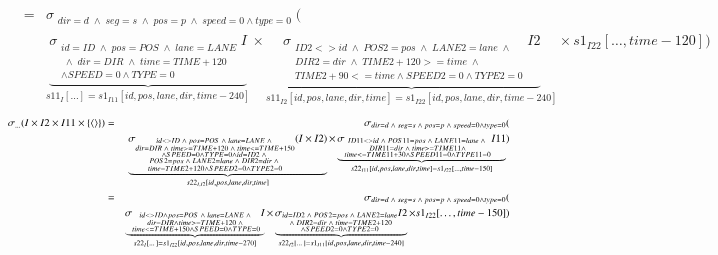 \begin{eqnarray}
&=& 
\sigma_{\substack{dir = d \;\wedge\; seg = s \;\wedge\; pos = p \;\wedge\; speed = 0 \wedge type = 0  }}(\\
\nonumber{}&& \underbrace{\sigma_{\substack{id = ID \;\wedge\; pos = POS \;\wedge\;  lane = LANE \\\;\wedge\; dir=DIR \;\wedge\; time = TIME + 120 \\\wedge SPEED = 0 \wedge TYPE = 0}} I}_{s11_{I}[\dots ]=s1_{I11}[id, pos, lane, dir, time-240]} \times 
\underbrace{\sigma_{\substack{ID2 <> id \;\wedge\; POS2 = pos \;\wedge\; LANE2 = lane \;\wedge\;\\ DIR2 = dir \;\wedge\; TIME2 +120 >= time \;\wedge\; \\TIME2 + 90 <= time \wedge SPEED2 = 0 \wedge TYPE2 = 0 }} I2}_{s11_{I2}[id, pos, lane, dir, time]=s1_{I22}[id, pos, lane, dir, time-240]} \times  
s1_{I22}[\dots, time-120]) 
\end{eqnarray}
\begin{eqnarray}
\sigma_{ \dots}(I \times I2 \times I11 \times \{\tuple{} \} )&=&
\sigma_{ \substack{dir = d \;\wedge\; seg = s \;\wedge\; pos = p \;\wedge\;speed = 0 \wedge type =0 }}(\\
\nonumber{}&&\underbrace{\sigma_{\substack{  id <> ID \;\wedge\;pos = POS \;\wedge\;  lane = LANE \;\wedge\;\\ dir = DIR   \;\wedge\; time >= TIME + 120 \;\wedge\; time <= TIME + 150 \\\wedge SPEED = 0 \wedge TYPE = 0 \wedge id = ID2 \;\wedge\;\\ POS2 = pos \;\wedge\; LANE2 = lane \;\wedge\; DIR2 = dir \;\wedge\; \\time = TIME2 + 120 \wedge  SPEED2 = 0 \wedge TYPE2 = 0}} (I \times I2)}_{s22_{I,I2}[id, pos, lane, dir, time]} \times 
\underbrace{\sigma_{\substack{ID11 <> id \;\wedge\; POS11 = pos \;\wedge\;  LANE11 = lane \;\wedge\;\\ DIR11=dir \;\wedge\; time >= TIME 11 \wedge\\ time <= TIME11 + 30  \wedge SPEED11 = 0 \wedge TYPE11 = 0}} I11}_{s22_{I11}[id, pos, lane, dir, time]=s1_{I22}[\dots, time-150]})\\
&=&
\sigma_{ \substack{dir = d \;\wedge\; seg = s \;\wedge\; pos = p \;\wedge\;speed = 0 \wedge type =0  }}(\\
\nonumber{}&&\underbrace{\sigma_{\substack{  id <> ID \wedge pos = POS \;\wedge\;  lane = LANE \;\wedge\;\\ dir = DIR \wedge  time >= TIME + 120 \;\wedge\;\\ time <= TIME + 150 \wedge SPEED = 0 \wedge TYPE = 0 }} I }_{s22_{I}[\dots]=s1_{I22}[id, pos, lane, dir, time-270]}\times 
\underbrace{\sigma_{\substack{id = ID2\;\wedge\;POS2 = pos \;\wedge\; LANE2 = lane \\\;\wedge\; DIR2 = dir \;\wedge\; time = TIME2 + 120\\ \wedge SPEED2 = 0 \wedge TYPE2 = 0}} I2}_{s22_{I2}[\dots]=s1_{I11}[id, pos, lane, dir, time-240]} \times 
s1_{I22}[\dots, time-150])
%
\end{eqnarray}
